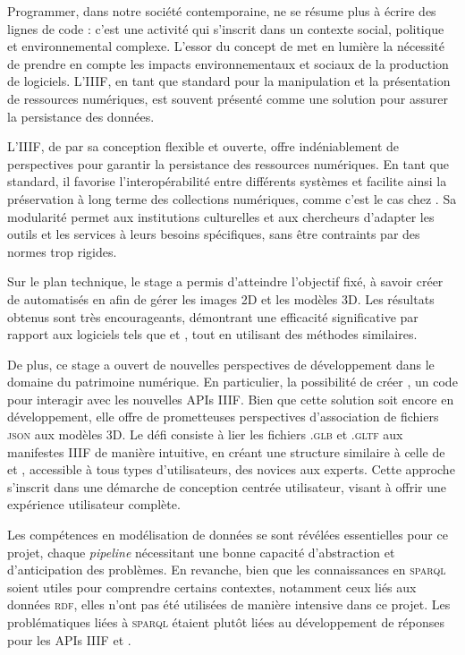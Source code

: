 
Programmer, dans notre société contemporaine, ne se résume plus à écrire des lignes de code : c’est une activité qui s’inscrit dans un contexte social, politique et environnemental complexe. L’essor du concept de \gco met en lumière la nécessité de prendre en compte les impacts environnementaux et sociaux de la production de logiciels. L'IIIF, en tant que standard pour la manipulation et la présentation de ressources numériques, est souvent présenté comme une solution pour assurer la persistance des données.

L'IIIF, de par sa conception flexible et ouverte, offre indéniablement de perspectives pour garantir la persistance des ressources numériques. En tant que standard, il favorise l'interopérabilité entre différents systèmes et facilite ainsi la préservation à long terme des collections numériques, comme c'est le cas chez \dsc. Sa modularité permet aux institutions culturelles et aux chercheurs d'adapter les outils et les services à leurs besoins spécifiques, sans être contraints par des normes trop rigides.

Sur le plan technique, le stage a permis d'atteindre l'objectif fixé, à savoir créer de  automatisés en \py afin de gérer les images 2D et les modèles 3D. Les résultats obtenus sont très encourageants, démontrant une efficacité significative par rapport aux logiciels tels que \gmp et \mlb, tout en utilisant des méthodes similaires.

De plus, ce stage a ouvert de nouvelles perspectives de développement dans le domaine du patrimoine numérique. En particulier, la possibilité de créer \diiif, un code \py pour interagir avec les nouvelles APIs IIIF. Bien que cette solution soit encore en développement, elle offre de prometteuses perspectives d'association de fichiers \textsc{json} aux modèles 3D. Le défi consiste à lier les fichiers \textsc{.glb} et \textsc{.gltf} aux manifestes IIIF de manière intuitive, en créant une structure similaire à celle de \cvt et \msh, accessible à tous types d'utilisateurs, des novices aux experts. Cette approche s'inscrit dans une démarche de conception centrée utilisateur, visant à offrir une expérience utilisateur complète.

Les compétences en modélisation de données se sont révélées essentielles pour ce projet, chaque \textit{pipeline} nécessitant une bonne capacité d'abstraction et d'anticipation des problèmes. En revanche, bien que les connaissances en \textsc{sparql} soient utiles pour comprendre certains contextes, notamment ceux liés aux données \textsc{rdf}, elles n'ont pas été utilisées de manière intensive dans ce projet. Les problématiques liées à \textsc{sparql} étaient plutôt liées au développement de réponses pour les APIs IIIF  et .

